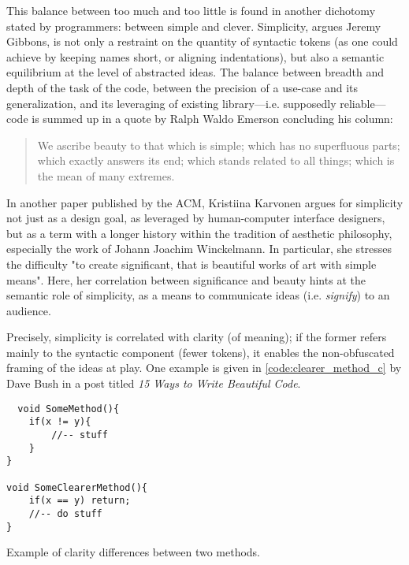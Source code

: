 This balance between too much and too little is found in another dichotomy stated by programmers: between simple and clever. Simplicity, argues Jeremy Gibbons, is not only a restraint on the quantity of syntactic tokens (as one could achieve by keeping names short, or aligning indentations), but also a semantic equilibrium at the level of abstracted ideas\cite{gibbons_beauty_2012}. The balance between breadth and depth of the task of the code, between the precision of a use-case and its generalization, and its leveraging of existing library—i.e. supposedly reliable—code is summed up in a quote by Ralph Waldo Emerson concluding his column:

\begin{quote}
  We ascribe beauty to that which is simple; which has no superfluous parts; which exactly answers its end; which stands related to all things; which is the mean of many extremes.\cite{gibbons_beauty_2012}
\end{quote}

In another paper published by the ACM, Kristiina Karvonen argues for simplicity not just as a design goal, as leveraged by human-computer interface designers, but as a term with a longer history within the tradition of aesthetic philosophy, especially the work of Johann Joachim Winckelmann\cite{karvonen_beauty_2000}. In particular, she stresses the difficulty "to create significant, that is beautiful works of art with simple means"\cite{karvonen_beauty_2000}. Here, her correlation between significance and beauty hints at the semantic role of simplicity, as a means to communicate ideas (i.e. \emph{signify}) to an audience.

Precisely, simplicity is correlated with clarity (of meaning); if the former refers mainly to the syntactic component (fewer tokens), it enables the non-obfuscated framing of the ideas at play. One example is given in \ref{code:clearer_method_c} by Dave Bush in a post titled  \emph{15 Ways to Write Beautiful Code}.

\begin{listing}
  \begin{verbatim}
  void SomeMethod(){
    if(x != y){
        //-- stuff
    }
}

void SomeClearerMethod(){
    if(x == y) return;
    //-- do stuff
}
\end{verbatim}
  \caption{Example of clarity differences between two methods.}
  \label{code:clearer_method_c}
\end{listing}

